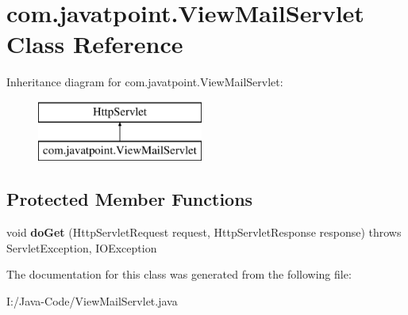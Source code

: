 \hypertarget{classcom_1_1javatpoint_1_1_view_mail_servlet}{}\section{com.\+javatpoint.\+View\+Mail\+Servlet Class Reference}
\label{classcom_1_1javatpoint_1_1_view_mail_servlet}
Inheritance diagram for com.\+javatpoint.\+View\+Mail\+Servlet\+:\begin{figure}[H]
\begin{center}
\leavevmode
\includegraphics[height=2.000000cm]{classcom_1_1javatpoint_1_1_view_mail_servlet}
\end{center}
\end{figure}
\subsection*{Protected Member Functions}
\begin{DoxyCompactItemize}
\item 
\mbox{\label{classcom_1_1javatpoint_1_1_view_mail_servlet_a2ecfe65f709c8d9ea2752a0d315d04e8}} 
void {\bfseries do\+Get} (Http\+Servlet\+Request request, Http\+Servlet\+Response response)  throws Servlet\+Exception, I\+O\+Exception 
\end{DoxyCompactItemize}


The documentation for this class was generated from the following file\+:\begin{DoxyCompactItemize}
\item 
I\+:/\+Java-\/\+Code/View\+Mail\+Servlet.\+java\end{DoxyCompactItemize}
